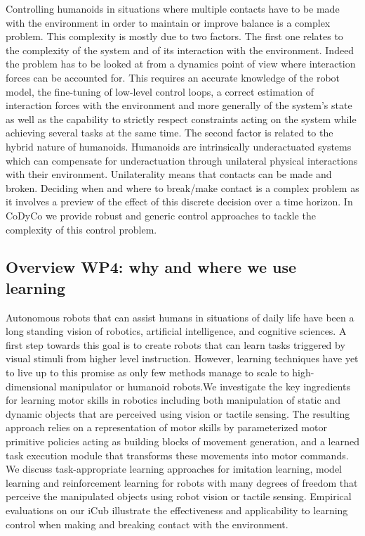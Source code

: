 \documentclass[12pt,a4paper,twoside]{article}
\begin{document}
Controlling humanoids in situations where multiple contacts have to be made with the environment in order to maintain or improve balance is a complex problem. This complexity is mostly due to two factors. The first one relates to the complexity of the system and of its interaction with the environment. Indeed the problem has to be looked at from a dynamics point of view where interaction forces can be accounted for. This requires an accurate knowledge of the robot model,  the fine-tuning of low-level control loops, a correct estimation of interaction forces with the environment and more generally of the system's state as well as the capability to strictly respect constraints acting on the system while achieving several tasks at the same time. The second factor is related to the hybrid nature of humanoids. Humanoids are intrinsically underactuated systems which can compensate for underactuation through unilateral physical interactions with their environment. Unilaterality means that contacts can be made and broken. Deciding when and where to break/make contact is a complex problem as it involves a preview of the effect of this discrete decision over a time horizon. In CoDyCo we  provide robust and generic control approaches to tackle the complexity of this control problem.

\subsection{Overview WP4: why and where we use learning}

Autonomous robots that can assist humans in situations of daily life have been a long standing vision of robotics, artificial intelligence, and cognitive sciences. A first step towards this goal is to create robots that can learn tasks triggered by visual stimuli from higher level instruction. However, learning techniques have yet to live up to this promise as only few methods manage to scale to high-dimensional manipulator or humanoid robots.We investigate the key ingredients for learning motor skills in robotics including both manipulation of static and dynamic objects that are perceived using vision or tactile sensing. The resulting approach relies on a representation of motor skills by parameterized motor primitive policies acting as building blocks of movement generation, and a learned task execution module that transforms these movements into motor commands. We discuss task-appropriate learning approaches for imitation learning, model learning and reinforcement learning for robots with many degrees of freedom that perceive the manipulated objects using robot vision or tactile sensing. Empirical evaluations on our iCub  illustrate the effectiveness and applicability to learning control when making and breaking contact with the environment.
\end{document}

